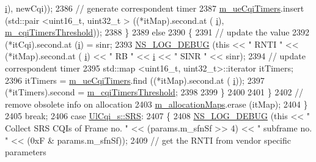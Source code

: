 \begin{DoxyCode}
      \hyperlink{bernuolliDistribution_8m_a6f6ccfcf58b31cb6412107d9d5281426}{i}), newCqi));
2386                 \textcolor{comment}{// generate correspondent timer}
2387                 \hyperlink{classns3_1_1CqaFfMacScheduler_a3393d690f2b1d2a41e428b87318b15e1}{m\_ueCqiTimers}.insert (std::pair <uint16\_t, uint32\_t > ((*itMap).second.at (
      \hyperlink{bernuolliDistribution_8m_a6f6ccfcf58b31cb6412107d9d5281426}{i}), \hyperlink{classns3_1_1CqaFfMacScheduler_ab2ea609b39ce10062f2bdd8027dd6edd}{m\_cqiTimersThreshold}));
2388               \}
2389             \textcolor{keywordflow}{else}
2390               \{
2391                 \textcolor{comment}{// update the value}
2392                 (*itCqi).second.at (\hyperlink{bernuolliDistribution_8m_a6f6ccfcf58b31cb6412107d9d5281426}{i}) = sinr;
2393                 \hyperlink{group__logging_ga413f1886406d49f59a6a0a89b77b4d0a}{NS\_LOG\_DEBUG} (\textcolor{keyword}{this} << \textcolor{stringliteral}{" RNTI "} << (*itMap).second.at (
      \hyperlink{bernuolliDistribution_8m_a6f6ccfcf58b31cb6412107d9d5281426}{i}) << \textcolor{stringliteral}{" RB "} << \hyperlink{bernuolliDistribution_8m_a6f6ccfcf58b31cb6412107d9d5281426}{i} << \textcolor{stringliteral}{" SINR "} << sinr);
2394                 \textcolor{comment}{// update correspondent timer}
2395                 std::map <uint16\_t, uint32\_t>::iterator itTimers;
2396                 itTimers = \hyperlink{classns3_1_1CqaFfMacScheduler_a3393d690f2b1d2a41e428b87318b15e1}{m\_ueCqiTimers}.find ((*itMap).second.at (
      \hyperlink{bernuolliDistribution_8m_a6f6ccfcf58b31cb6412107d9d5281426}{i}));
2397                 (*itTimers).second = \hyperlink{classns3_1_1CqaFfMacScheduler_ab2ea609b39ce10062f2bdd8027dd6edd}{m\_cqiTimersThreshold};
2398 
2399               \}
2400 
2401           \}
2402         \textcolor{comment}{// remove obsolete info on allocation}
2403         \hyperlink{classns3_1_1CqaFfMacScheduler_a3b02c0d7a89f3ed393066ba9bfda6210}{m\_allocationMaps}.erase (itMap);
2404       \}
2405       \textcolor{keywordflow}{break};
2406     \textcolor{keywordflow}{case} \hyperlink{structns3_1_1UlCqi__s_aece9e5ebea42eb9ff1744c72c8459b57af4b6dba4243636562c910c4d4761dd7e}{UlCqi\_s::SRS}:
2407       \{
2408         \hyperlink{group__logging_ga413f1886406d49f59a6a0a89b77b4d0a}{NS\_LOG\_DEBUG} (\textcolor{keyword}{this} << \textcolor{stringliteral}{" Collect SRS CQIs of Frame no. "} << (params.m\_sfnSf >> 4) << \textcolor{stringliteral}{"
       subframe no. "} << (0xF & params.m\_sfnSf));
2409         \textcolor{comment}{// get the RNTI from vendor specific parameters}

\end{DoxyCode}
